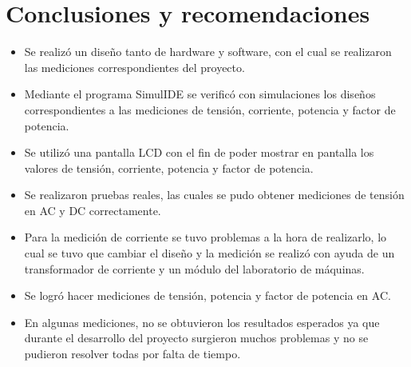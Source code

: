 \section{Conclusiones y recomendaciones}
\begin{itemize}
    \item Se realizó un diseño tanto de hardware y software, con el cual se realizaron las mediciones correspondientes del proyecto.
    \item Mediante el programa SimulIDE se verificó con simulaciones los diseños correspondientes a las mediciones de tensión, corriente, potencia y factor de potencia.
    \item Se utilizó una pantalla LCD  con el fin de poder mostrar en pantalla los valores de tensión, corriente, potencia y factor de potencia.
    \item Se realizaron pruebas reales, las cuales se pudo obtener mediciones de tensión en AC y DC correctamente.
    \item Para la medición de corriente se tuvo problemas a la hora de realizarlo, lo cual se tuvo que cambiar el diseño y la medición se realizó con ayuda de un transformador de corriente y un módulo del laboratorio de máquinas.
    \item  Se logró hacer mediciones de tensión, potencia y factor de potencia en AC.
    \item En algunas mediciones, no se obtuvieron los resultados esperados ya que durante el desarrollo del proyecto surgieron muchos problemas y no se pudieron resolver todas por falta de tiempo.
\end{itemize}



 





